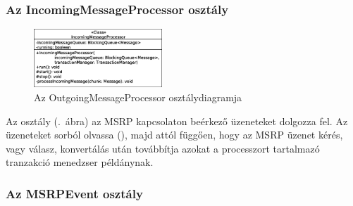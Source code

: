 \subsubsection*{Az IncomingMessageProcessor osztály}
\label{sec:msrp_incomingprocessor}
\begin{figure}
  \vspace{-15pt}
  \begin{center}
    \includegraphics[width=0.43\textwidth]{img/class_diagrams/IncomingMessageProcessor.eps}
  \end{center}
  \vspace{-15pt}
  \captionsetup{font=scriptsize}
  \caption{Az OutgoingMessageProcessor osztálydiagramja}
   \label{fig:class_incomingprocessor}
  \vspace{-10pt}
\end{figure}
Az  osztály (.~ábra) az MSRP kapcsolaton beérkező üzeneteket dolgozza fel. Az üzeneteket sorból olvassa (), majd attól függően, hogy az MSRP üzenet kérés, vagy válasz, konvertálás után továbbítja azokat a processzort tartalmazó tranzakció menedzser példánynak. 

\subsubsection*{Az MSRPEvent osztály}
\label{sec:msrp_event}

